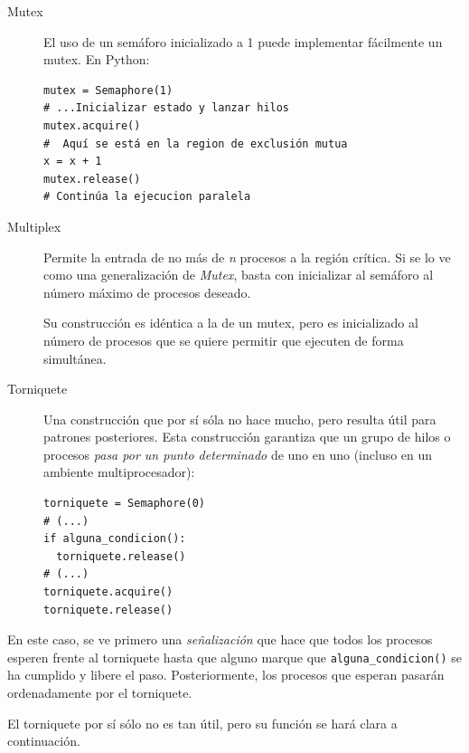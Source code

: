 \documentclass[11pt,fleqn]{book} %
\begin{document}
\begin{description}
\item[Mutex] El uso de un semáforo inicializado a 1 puede implementar
	   fácilmente un mutex. En Python:


\begin{verbatim}
mutex = Semaphore(1)
# ...Inicializar estado y lanzar hilos
mutex.acquire()
#  Aquí se está en la region de exclusión mutua
x = x + 1
mutex.release()
# Continúa la ejecucion paralela
\end{verbatim}
\end{description}

\begin{description}
\item[Multiplex] Permite la entrada de no más de \emph{n} procesos a la
               región crítica. Si se lo ve como una generalización de
               \emph{Mutex}, basta con inicializar al semáforo al número
               máximo de procesos deseado.

	       Su construcción es idéntica a la de un mutex, pero es
               inicializado al número de procesos que se quiere
               permitir que ejecuten de forma simultánea.
\item[Torniquete] Una construcción que por sí sóla no hace mucho, pero
                resulta útil para patrones posteriores. Esta
                construcción garantiza que un grupo de hilos o
                procesos \emph{pasa por un punto determinado} de uno en uno
                (incluso en un ambiente multiprocesador):


\begin{verbatim}
torniquete = Semaphore(0)
# (...)
if alguna_condicion():
  torniquete.release()
# (...)
torniquete.acquire()
torniquete.release()
\end{verbatim}
\end{description}

                En este caso, se ve primero una \emph{señalización} que
                hace que todos los procesos esperen frente al
                torniquete hasta que alguno marque que
                \texttt{alguna\_condicion()} se ha cumplido y libere el
                paso. Posteriormente, los procesos que esperan
                pasarán ordenadamente por el torniquete.

		El torniquete por sí sólo no es tan útil, pero su
                función se hará clara a continuación.
\end{document}
